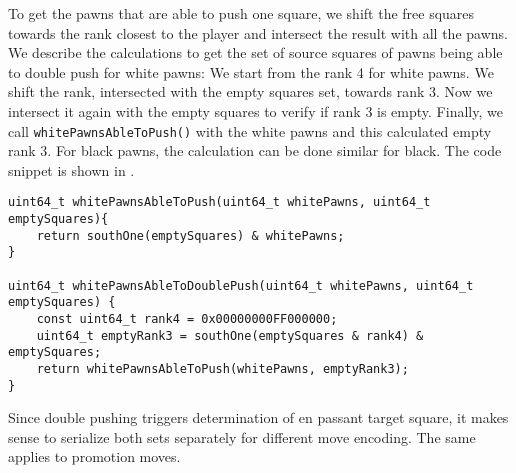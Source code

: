 %
To get the pawns that are able to push one square, we shift the free squares towards the rank closest to the player and intersect the result with all the pawns.
We describe the calculations to get the set of source squares of pawns being able to double push for white pawns:
We start from the rank 4 for white pawns.
We shift the rank, intersected with the empty squares set, towards rank 3. 
Now we intersect it again with the empty squares to verify if rank 3 is empty. Finally, we call \texttt{whitePawnsAbleToPush()} with the white pawns and this calculated empty rank 3. 
For black pawns, the calculation can be done similar for black.
The code snippet is shown in .
%
\begin{listing}
\begin{verbatim}
uint64_t whitePawnsAbleToPush(uint64_t whitePawns, uint64_t emptySquares){
	return southOne(emptySquares) & whitePawns;
}

uint64_t whitePawnsAbleToDoublePush(uint64_t whitePawns, uint64_t emptySquares) {
	const uint64_t rank4 = 0x00000000FF000000;
	uint64_t emptyRank3 = southOne(emptySquares & rank4) & emptySquares;
	return whitePawnsAbleToPush(whitePawns, emptyRank3);
}
\end{verbatim}
\label{fig: white pawns able to push}
\end{listing}
%
Since double pushing triggers determination of en passant target square, it makes sense to serialize both sets separately for different move encoding. The same applies to promotion moves.

